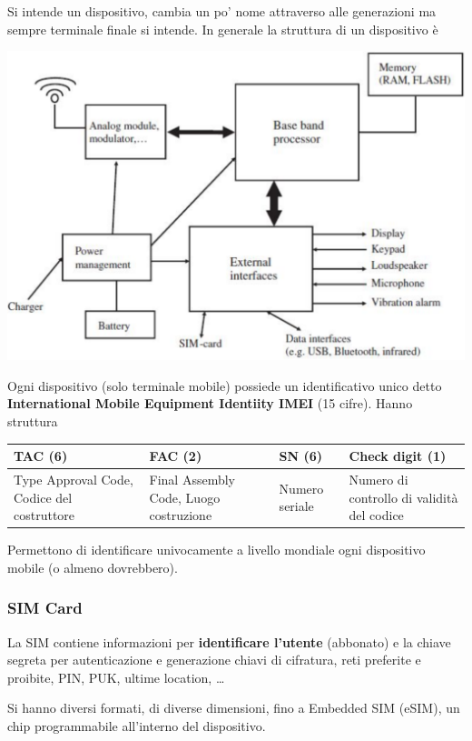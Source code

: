 Si intende un dispositivo, cambia un po' nome attraverso alle generazioni ma sempre terminale finale si intende. In generale la struttura di un dispositivo è
\begin{center}
	\includegraphics[width=0.65\linewidth]{img/mobile/ms1}
\end{center}

Ogni dispositivo (solo terminale mobile) possiede un identificativo unico detto \textbf{International Mobile Equipment Identiity IMEI} (15 cifre). Hanno struttura
\begin{center}
	\begin{tabular}{| >{\centering\arraybackslash}m{3cm} | >{\centering\arraybackslash}m{2cm} | >{\centering\arraybackslash}m{3cm} | >{\centering\arraybackslash}m{2cm} |}
		\hline
		\textbf{TAC (6)} & \textbf{FAC (2)} & \textbf{SN (6)} & \textbf{Check digit (1)} \\
		\hline
		Type Approval Code, Codice del costruttore & 
		Final Assembly Code, Luogo costruzione & 
		Numero seriale & 
		Numero di controllo di validità del codice \\
		\hline
	\end{tabular}
\end{center}
Permettono di identificare univocamente a livello mondiale ogni dispositivo mobile (o almeno dovrebbero).

\subsubsection{SIM Card}

La SIM contiene informazioni per \textbf{identificare l'utente} (abbonato) e la chiave segreta per autenticazione e generazione chiavi di cifratura, reti preferite e proibite, PIN, PUK, ultime location, \dots 

Si hanno diversi formati, di diverse dimensioni, fino a Embedded SIM (eSIM), un chip programmabile all'interno del dispositivo.

